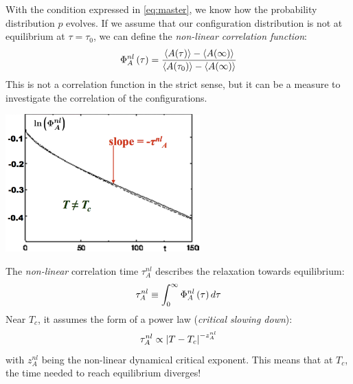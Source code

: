 \vspace{0.1cm}
\noindent
\begin{minipage}{\textwidth}
\begin{minipage}{.48\textwidth}

With the condition expressed in \eqref{eq:master}, we know how the probability distribution $p$ evolves. If we assume that our configuration distribution is not at equilibrium at $\tau = \tau_0$, we can define the \emph{non-linear correlation function}:
\begin{equation}
\Phi_A^{nl}\left(\tau\right) = \frac {\left<A(\tau)\right>- \left<A(\infty)\right>}  {\left<A(\tau_0)\right>- \left<A(\infty)\right>}
\end{equation}
This is not a correlation function in the strict sense, but it can be a measure to investigate the correlation of the configurations. 
\end{minipage}%
\hfill
\begin{minipage}{.48\textwidth}
  \centering
  \includegraphics[height=150pt]{pics/non_lin_corr_fun}
  \label{fig:non_lin_corr_fun.pdf}
\end{minipage}
\end{minipage}
\vspace{0.1cm}



The \emph{non-linear} correlation time $\tau_A^{nl}$ describes the relaxation towards equilibrium:
\begin{equation}
\tau_A^{nl} \equiv \int_0^{\infty} \Phi_A^{nl}\left(\tau\right) d\tau
\end{equation}
Near $T_c$, it assumes the form of a power law (\emph{critical slowing down}):
\begin{equation}
\tau_A^{nl} \propto \left|T-T_c\right|^{-z_A^{nl}}
\end{equation} with $z_A^{nl}$ being the non-linear dynamical critical exponent. This means that at $T_c$, the time needed to reach equilibrium diverges!






